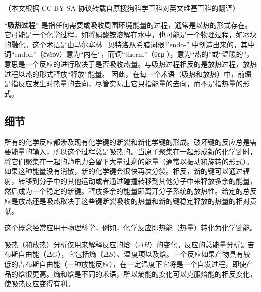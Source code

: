 
（本文根据 CC-BY-SA 协议转载自原搜狗科学百科对英文维基百科的翻译）

“\textbf{吸热过程}” 是指任何需要或吸收周围环境能量的过程，通常是以热的形式存在。它可能是一个化学过程，如将硝酸铵溶解在水中，也可能是一个物理过程，如冰块的融化。这个术语是由马尔塞林·贝特洛从希腊词根“'endo-” 中创造出来的，其中词“endon”（ἔνδον）意为“内在”，而词“therm”（θεμ-），意为“热的”或“温暖的”，意思是一个反应的进行取决于是否吸收热量。与吸热过程相反的是放热过程，放热过程以热的形式释放“释放”能量。 因此，在每一个术语（吸热和放热）中，前缀是指反应发生时热量的去向，尽管实际上它只指能量的去向，而不是指热量的形式。

\subsection{细节}
所有的化学反应都涉及现有化学键的断裂和新化学键的形成。破坏键的反应总是需要能量的输入，所以这个过程总是吸热的。当原子聚集在一起形成新的化学键时，将它们聚集在一起的静电力会留下大量过剩的能量（通常以振动和旋转的形式）。如果这种能量没有消散，新的化学键会很快再次分裂。相反，新的键可以通过辐射，转移到分子中的其他运动或者通过碰撞转移到其他分子中来释放多余的能量，然后成为一个稳定的新键。释放多余的能量即离开分子系统的放热性。给定的总反应是放热还是吸热取决于这些键断裂吸收的热量和新的键稳定释放的热量的相对贡献。

这个概念经常应用于物理科学，例如，化学反应即热能（热量）转化为化学键能。

吸热（和放热）分析仅用来解释反应的焓（$\Delta H$）的变化。反应的总能量分析是吉布斯自由能（$\Delta G$），它包括熵（$\Delta S$）、温度项以及焓。一个反应如果产物具有较低的吉布斯自由能（一种放能反应），在一定温度下它将是一个自发过程，即使产品的焓很更高。熵和焓是不同的术语，所以熵能的变化可以克服焓能的相反变化，使吸热反应变得有利。